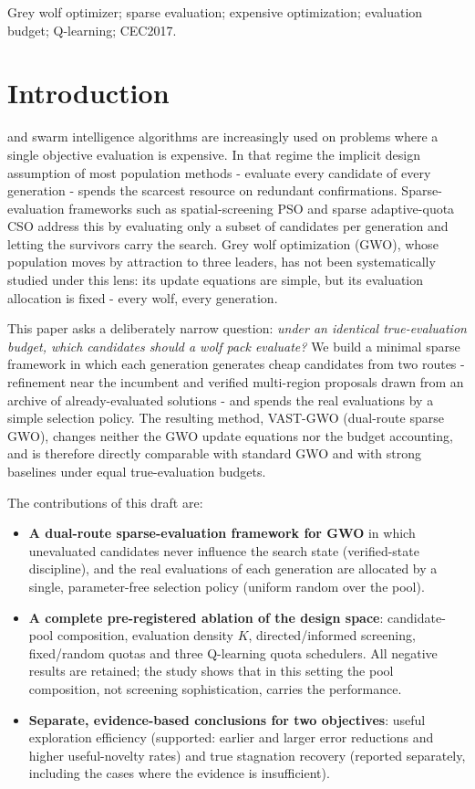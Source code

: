 \documentclass[journal]{IEEEtran}
\newcommand{\method}{VAST-GWO}
\begin{document}
\begin{IEEEkeywords}
Grey wolf optimizer; sparse evaluation; expensive optimization; evaluation
budget; Q-learning; CEC2017.
\end{IEEEkeywords}

\section{Introduction}
 and swarm intelligence algorithms are
increasingly used on problems where a single objective evaluation is
expensive. In that regime the implicit design assumption of most population
methods - evaluate every candidate of every generation - spends the scarcest
resource on redundant confirmations. Sparse-evaluation frameworks such as
spatial-screening PSO and sparse adaptive-quota CSO address this by
evaluating only a subset of candidates per generation and letting the
survivors carry the search. Grey wolf optimization (GWO), whose population
moves by attraction to three leaders, has not been systematically studied
under this lens: its update equations are simple, but its evaluation
allocation is fixed - every wolf, every generation.

This paper asks a deliberately narrow question: \emph{under an identical
true-evaluation budget, which candidates should a wolf pack evaluate?} We
build a minimal sparse framework in which each generation generates cheap
candidates from two routes - refinement near the incumbent and verified
multi-region proposals drawn from an archive of already-evaluated solutions -
and spends the real evaluations by a simple selection policy. The resulting
method, \method{} (dual-route sparse GWO), changes neither the GWO update
equations nor the budget accounting, and is therefore directly comparable
with standard GWO and with strong baselines under equal true-evaluation
budgets.

The contributions of this draft are:
\begin{itemize}
\item \textbf{A dual-route sparse-evaluation framework for GWO} in which
unevaluated candidates never influence the search state (verified-state
discipline), and the real evaluations of each generation are allocated by a
single, parameter-free selection policy (uniform random over the pool).
\item \textbf{A complete pre-registered ablation of the design space}:
candidate-pool composition, evaluation density $K$, directed/informed
screening, fixed/random quotas and three Q-learning quota schedulers. All
negative results are retained; the study shows that in this setting the
pool composition, not screening sophistication, carries the performance.
\item \textbf{Separate, evidence-based conclusions for two objectives}:
useful exploration efficiency (supported: earlier and larger error
reductions and higher useful-novelty rates) and true stagnation recovery
(reported separately, including the cases where the evidence is
insufficient).
\end{itemize}
\end{document}
